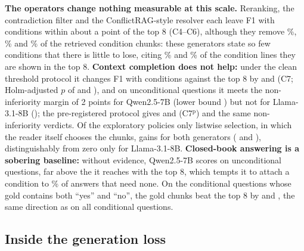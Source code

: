 \textbf{The operators change nothing measurable at this scale.} Reranking, the contradiction filter and the ConflictRAG-style resolver each leave F1 with conditions within about a point of the top 8 (C4--C6), although they remove \rrCondDrop\%, \nliCondDrop\% and \crsCondDrop\% of the retrieved condition chunks: these generators state so few conditions that there is little to lose, citing \noticedTopQwen\% and \noticedTopLlama\% of the condition lines they are shown in the top 8. \textbf{Context completion does not help:} under the clean threshold protocol it changes F1 with conditions against the top 8 by \clCSevenQwenPt{} and \clCSevenLlamaPt{} (C7; Holm-adjusted $p$ of \clCSevenHolmQwen{} and \clCSevenHolmLlama), and on unconditional questions it meets the non-inferiority margin of 2 points for Qwen2.5-7B (lower bound \clCEightLowQwen) but not for Llama-3.1-8B (\clCEightLowLlama); the pre-registered protocol gives \cSevenQwenPt{} and \cSevenLlamaPt{} (C7$^{\mathrm{p}}$) and the same non-inferiority verdicts. Of the exploratory policies only listwise selection, in which the reader itself chooses the chunks, gains for both generators (\eSevenQwen{} and \eSevenLlama), distinguishably from zero only for Llama-3.1-8B. \textbf{Closed-book answering is a sobering baseline:} without evidence, Qwen2.5-7B scores \fcClosedUncondQwen{} on unconditional questions, far above the \fcTopUncondQwen{} it reaches with the top 8, which tempts it to attach a condition to \anyCondTopUncondQwen\% of answers that need none. On the \nOppositeQwen{} conditional questions whose gold contains both ``yes'' and ``no'', the gold chunks beat the top 8 by \eSixQwen{} and \eSixLlama{}, the same direction as on all conditional questions.





\subsection{Inside the generation loss}
\label{sec:diagnostics}

